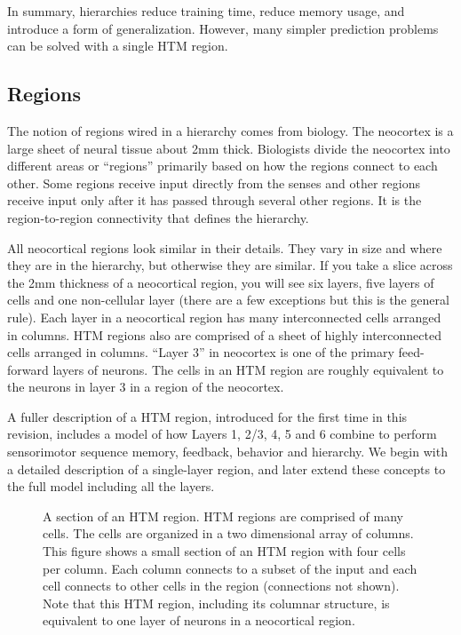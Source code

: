 \documentclass{report}
\begin{document}
In summary, hierarchies reduce training time, reduce memory usage, and
introduce a form of generalization. However, many simpler prediction
problems can be solved with a single HTM region.

\subsection*{Regions}

The notion of regions wired in a hierarchy comes from biology. The
neocortex is a large sheet of neural tissue about 2mm
thick. Biologists divide the neocortex into different areas or
``regions'' primarily based on how the regions connect to each
other. Some regions receive input directly from the senses and other
regions receive input only after it has passed through several other
regions. It is the region-to-region connectivity that defines the
hierarchy.

All neocortical regions look similar in their details. They vary in
size and where they are in the hierarchy, but otherwise they are
similar. If you take a slice across the 2mm thickness of a neocortical
region, you will see six layers, five layers of cells and one
non-cellular layer (there are a few exceptions but this is the general
rule). Each layer in a neocortical region has many interconnected
cells arranged in columns. HTM regions also are comprised of a sheet
of highly interconnected cells arranged in columns. ``Layer 3'' in
neocortex is one of the primary feed-forward layers of neurons. The
cells in an HTM region are roughly equivalent to the neurons in layer
3 in a region of the neocortex.

A fuller description of a HTM region, introduced for the first time in
this revision, includes a model of how Layers 1, 2/3, 4, 5 and 6 combine 
to perform sensorimotor sequence memory, feedback, behavior and hierarchy.
We begin with a detailed description of a single-layer region, and later
extend these concepts to the full model including all the layers.

\begin{figure}
\caption{A section of an HTM region. HTM regions are comprised of many
  cells. The cells are organized in a two dimensional array of
  columns. This figure shows a small section of an HTM region with
  four cells per column. Each column connects to a subset of the input
  and each cell connects to other cells in the region (connections not
  shown). Note that this HTM region, including its columnar structure,
  is equivalent to one layer of neurons in a neocortical region.}
\label{figure:one-region}
\end{figure}
\end{document}
